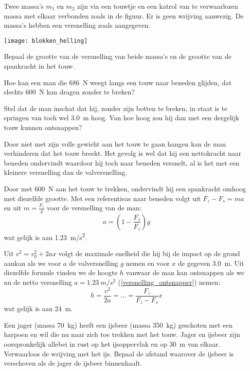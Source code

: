\documentclass{ximera}
\begin{document}
\begin{exercise}
    Twee massa's $m_1$ en $m_2$ zijn via een touwtje en een katrol van te verwaarlozen massa met elkaar verbonden zoals in de figuur. Er is geen wrijving aanwezig. De massa's hebben een versnelling zoals aangegeven.

    \begin{image}
        \texttt{[image: blokken\_helling]}
    \end{image}

    Bepaal de grootte van de versnelling van beide massa's en de grootte van de spankracht in het touw.
\end{exercise}

\begin{exercise}
	Hoe kan een man die \SI{686}{N} weegt langs een touw naar beneden glijden, dat slechts \SI{600}{N} kan dragen zonder te breken?

	Stel dat de man inschat dat hij, zonder zijn botten te breken, in staat is te springen van toch wel \SI{3,0}{m} hoog. Van hoe hoog zou hij dan met een dergelijk touw kunnen ontsnappen?

	\begin{oplossing}
		Door niet met zijn volle gewicht aan het touw te gaan hangen kan de man verhinderen dat het touw breekt. Het gevolg is wel dat hij een nettokracht naar beneden ondervindt waardoor hij toch naar beneden versnelt, al is het met een kleinere versnelling dan de valversnelling.

		Door met \SI{600}{N} aan het touw te trekken, ondervindt hij een spankracht omhoog met diezelfde grootte. Met een referentieas naar beneden volgt uit $F_z-F_s=ma$ en uit $m=\frac{F_z}{g}$ voor de versnelling van de man:
		\begin{equation}
			a=\left(1-\frac{F_s}{F_z}\right)g\label{versnelling_ontsnapper}
		\end{equation}
		wat gelijk is aan \SI{1,23}{m/s^2}.

		Uit $v^2=v_0^2+2ax$ volgt de maximale snelheid die hij bij de impact op de grond aankan als we voor $a$ de valversnelling $g$ nemen en voor $x$ de gegeven \SI{3,0}{m}. Uit diezelfde formule vinden we de hoogte $h$ vanwaar de man kan ontsnappen als we nu de netto versnelling $a=\SI{1,23}{m/s^2}$ (\ref{versnelling_ontsnapper}) nemen: 
		\begin{equation*}
			h=\frac{v^2}{2a}=\ldots=\frac{F_z}{F_z-F_s}x
		\end{equation*}
		wat gelijk is aan \SI{24}{m}.
	\end{oplossing}
\end{exercise}

\begin{exercise}
    Een jager (massa \SI{70}{kg}) heeft een ijsbeer (massa \SI{350}{kg}) geschoten met een harpoen en wil die nu naar zich toe trekken met het touw. Jager en ijsbeer zijn oorspronkelijk allebei in rust op het ijsoppervlak en op \SI{30}{m} van elkaar. Verwaarloos de wrijving met het ijs. Bepaal de afstand waarover de ijsbeer is verschoven als de jager de ijsbeer binnenhaalt.
\end{exercise}
\end{document}
